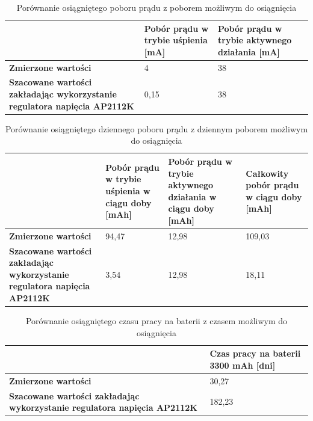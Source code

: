         \begin{table}[]
            \caption{Porównanie osiągniętego poboru prądu z poborem możliwym do osiągnięcia}
            \centering
            \begin{tabular}{p{6cm}|p{4cm}|p{4cm} }
                    & \textbf{Pobór prądu w trybie uśpienia [mA]} & \textbf{Pobór prądu w trybie aktywnego działania [mA]} \\ \hline
             \textbf{Zmierzone wartości}
                      & 4 & 38 \\
            \textbf{Szacowane wartości zakładając wykorzystanie regulatora napięcia AP2112K} &  0,15 & 38  \\
            \end{tabular}
            \label{tbl:tab1}
            \vspace{10mm}
        \end{table}

        \begin{table}[]
            \centering
            \caption{Porównanie osiągniętego dziennego poboru prądu z dziennym poborem możliwym do osiągnięcia}
            \begin{tabular}{p{4cm}|p{3cm}|p{3cm}|p{3cm} }
                    & \textbf{Pobór prądu w trybie uśpienia w ciągu doby [mAh]} & \textbf{Pobór prądu w trybie aktywnego działania w ciągu doby [mAh]} & \textbf{Całkowity pobór prądu w ciągu doby [mAh]} \\ \hline
             \textbf{Zmierzone wartości}
                      & 94,47 & 12,98 & 109,03 \\
            \textbf{Szacowane wartości zakładając wykorzystanie regulatora napięcia AP2112K} &  3,54 & 12,98 & 18,11 \\
            \end{tabular}
            \label{tbl:tab2}
            \vspace{10mm}
        \end{table}

        \begin{table}[]
            \caption{Porównanie osiągniętego czasu pracy na baterii z czasem możliwym do osiągnięcia}
            \centering
            \begin{tabular}{p{9cm}|p{5cm}}
                    & \textbf{Czas pracy na baterii 3300 mAh [dni]} \\ \hline
             \textbf{Zmierzone wartości}
                      & 30,27 \\
            \textbf{Szacowane wartości zakładając wykorzystanie regulatora napięcia AP2112K} &  182,23  \\
            \end{tabular}
            \label{tbl:tab3}
            \vspace{10mm}
        \end{table}

